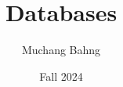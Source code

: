 \documentclass{article}
\begin{document}
\title{Databases}
\author{Muchang Bahng}
\date{Fall 2024}

\maketitle
\tableofcontents
\pagebreak 











\end{document}
